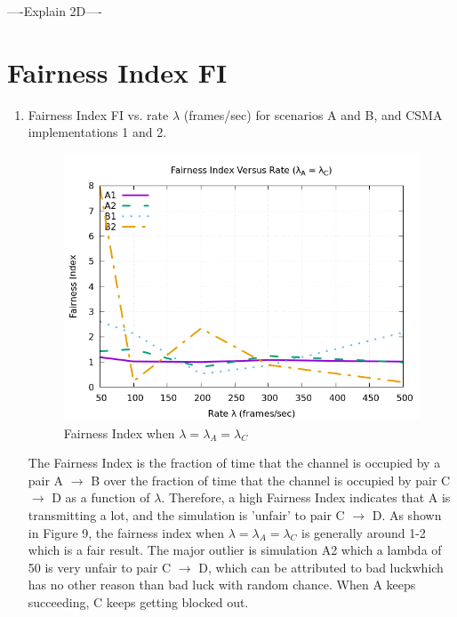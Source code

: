 \documentclass[12pt]{article}
\begin{document}
\begin{enumerate}
{            ----Explain 2D----
        }        
    
    
    \end{enumerate}
    
    
\clearpage
    \section{Fairness Index FI}

    \begin{enumerate}
    
        \item {
            Fairness Index FI vs. rate \(\lambda{}\) (frames/sec) for scenarios A and B, and CSMA implementations 1 and 2.
            
            \begin{figure}[!htb]
                \centering
                \includegraphics[width=5in]{3A.png}
                \caption{Fairness Index when \(\lambda{} = \lambda{}_A = \lambda{}_C\) }
                \label{fig:3A}
            \end{figure}

            The Fairness Index is the fraction of time that the channel is occupied by a pair A \(\rightarrow\) B over the fraction of time that the channel is occupied by pair C \(\rightarrow\) D as a function of \(\lambda\). Therefore, a high Fairness Index indicates that A is transmitting a lot, and the simulation is 'unfair' to pair C \(\rightarrow\) D. As shown in Figure 9, the fairness index when \(\lambda{} = \lambda{}_A = \lambda{}_C\) is generally around 1-2 which is a fair result. The major outlier is simulation A2 which a lambda of 50 is very unfair to pair C \(\rightarrow\) D, which can be attributed to bad luckwhich has no other reason than bad luck with random chance. When A keeps succeeding, C keeps getting blocked out.
        }    
    

\end{enumerate}
\end{document}
